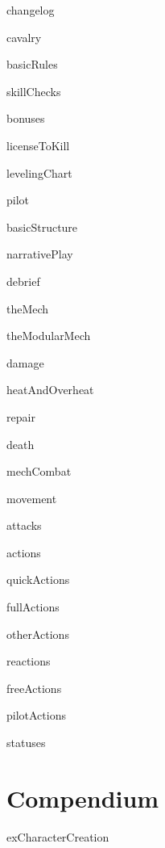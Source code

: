 \documentclass{article}
\begin{document}
{changelog}  
\newpage
        

\tableofcontents
\newpage


{cavalry}    
\newpage

{basicRules}    
\newpage

{skillChecks}    
\newpage

{bonuses}    
\newpage

{licenseToKill}    
\newpage

{levelingChart}    
\newpage

{pilot}    
\newpage

{basicStructure}    
\newpage

{narrativePlay}    
\newpage

{debrief}    
\newpage

{theMech}    
\newpage

{theModularMech}    
\newpage

{damage}    
\newpage

{heatAndOverheat}    
\newpage

{repair}    
\newpage

{death}    
\newpage

{mechCombat}    
\newpage

{movement}    
\newpage

{attacks}    
\newpage

{actions}    
\newpage

{quickActions}
\newpage

{fullActions}    
\newpage

{otherActions}    
\newpage

{reactions}    
\newpage

{freeActions}    
\newpage

{pilotActions}    
\newpage

{statuses}    
\newpage
\section{Compendium}
\newpage

{exCharacterCreation}    
\newpage
\end{document}
